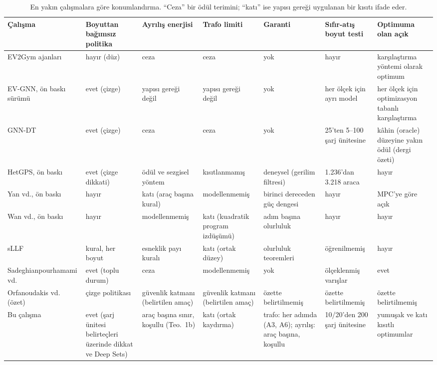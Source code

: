 \begin{table}[t]
\centering
\caption{En yakın çalışmalara göre konumlandırma. ``Ceza'' bir ödül terimini; ``katı'' ise yapısı gereği uygulanan bir kısıtı ifade eder.}
\label{tab:positioning}
\footnotesize
\setlength{\tabcolsep}{3pt}
\begin{tabular}{@{}>{\raggedright}p{2.6cm}>{\raggedright}p{2.0cm}>{\raggedright}p{2.0cm}>{\raggedright}p{2.0cm}>{\raggedright}p{2.2cm}>{\raggedright}p{1.9cm}>{\raggedright\arraybackslash}p{2.0cm}@{}}
\toprule
Çalışma & Boyuttan bağımsız politika & Ayrılış enerjisi & Trafo limiti & Garanti & Sıfır-atış boyut testi & Optimuma olan açık \\
\midrule
EV2Gym ajanları \cite{orfanoudakis2025ev2gym} & hayır (düz) & ceza & ceza & yok & hayır & karşılaştırma yöntemi olarak optimum \\
EV-GNN, ön baskı sürümü \cite{orfanoudakis2025scalable} & evet (çizge) & yapısı gereği değil & yapısı gereği değil & yok & her ölçek için ayrı model & her ölçek için optimizasyon tabanlı karşılaştırma \\
GNN-DT \cite{orfanoudakis2026graph} & evet (çizge) & ceza & ceza & yok & 25'ten 5--100 şarj ünitesine & kâhin (oracle) düzeyine yakın ödül (dergi özeti) \\
HetGPS, ön baskı \cite{wang2026hetgps} & evet (çizge dikkati) & ödül ve sezgisel yöntem & kısıtlanmamış & deneysel (gerilim filtresi) & 1.236'dan 3.218 araca & hayır \\
Yan vd., ön baskı \cite{yan2026hierarchical} & hayır & katı (araç başına kural) & modellenmemiş & birinci dereceden güç dengesi & hayır & MPC'ye göre açık \\
Wan vd., ön baskı \cite{wan2025logicinformed} & hayır & modellenmemiş & katı (kuadratik program izdüşümü) & adım başına olurluluk & hayır & hayır \\
sLLF \cite{chen2022smoothed} & kural, her boyut & esneklik payı kuralı & katı (ortak düzey) & olurluluk teoremleri & öğrenilmemiş & hayır \\
Sadeghian\-pourhamami vd. \cite{sadeghianpourhamami2020definition} & evet (toplu durum) & ceza & modellenmemiş & yok & ölçeklenmiş varışlar & evet \\
Orfanoudakis vd. \cite{orfanoudakis2026can} (özet) & çizge politikası & güvenlik katmanı (belirtilen amaç) & güvenlik katmanı (belirtilen amaç) & özette belirtilmemiş & özette belirtilmemiş & özette belirtilmemiş \\
\midrule
Bu çalışma & evet (şarj ünitesi belirteçleri üzerinde dikkat ve Deep Sets) & araç başına sınır, koşullu (Teo.~1b) & katı (ortak kaydırma) & trafo: her adımda (A3, A6); ayrılış: araç başına, koşullu & 10/20'den 200 şarj ünitesine & yumuşak ve katı kısıtlı optimumlar \\
\bottomrule
\end{tabular}
\end{table}
